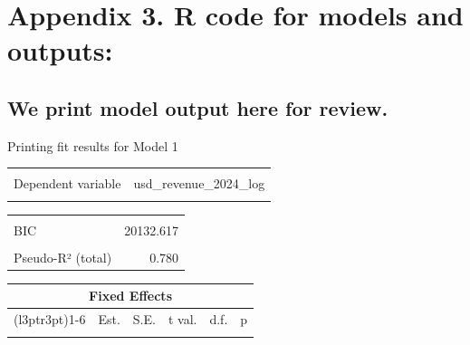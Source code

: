 \documentclass[
  12pt]{article}
\begin{document}
\newpage

\section{Appendix 3. R code for models and
outputs:}\label{appendix-3.-r-code-for-models-and-outputs}

\subsection{We print model output here for
review.}\label{we-print-model-output-here-for-review.}

Printing fit results for Model 1

\begin{table}[!h]
\centering
\begin{tabular}{lr}
\toprule
\cellcolor{gray!10}{Observations} & \cellcolor{gray!10}{7023}\\
Dependent variable & usd\_revenue\_2024\_log\\
\cellcolor{gray!10}{Type} & \cellcolor{gray!10}{Mixed effects linear regression}\\
\bottomrule
\end{tabular}
\end{table} \begin{table}[!h]
\centering
\begin{tabular}{lr}
\toprule
\cellcolor{gray!10}{AIC} & \cellcolor{gray!10}{20105.189}\\
BIC & 20132.617\\
\cellcolor{gray!10}{Pseudo-R² (fixed effects)} & \cellcolor{gray!10}{0.000}\\
Pseudo-R² (total) & 0.780\\
\bottomrule
\end{tabular}
\end{table} \begin{table}[!h]
\centering
\begin{threeparttable}
\begin{tabular}{lrrrrr}
\toprule
\multicolumn{6}{c}{Fixed Effects} \\
\cmidrule(l{3pt}r{3pt}){1-6}
  & Est. & S.E. & t val. & d.f. & p\\
\midrule
\cellcolor{gray!10}{(Intercept)} & \cellcolor{gray!10}{15.821} & \cellcolor{gray!10}{0.069} & \cellcolor{gray!10}{228.895} & \cellcolor{gray!10}{26.989} & \cellcolor{gray!10}{0.000}\\
\bottomrule
\end{tabular}
\begin{tablenotes}

\end{tablenotes}
\end{threeparttable}
\end{table}
\end{document}
